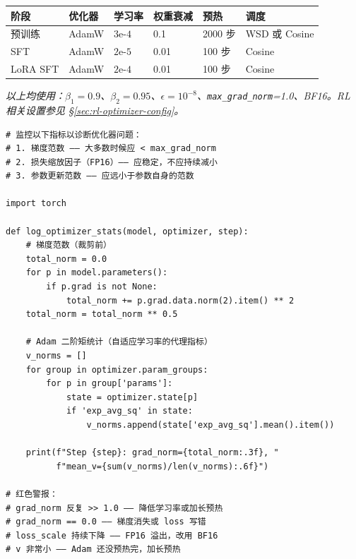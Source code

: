 \begin{keybox}[优化器超参数参考表]
\noindent\begin{tabularx}{\linewidth}{@{}l Z{0.92} Z{0.92} Z{0.92} Z{0.92} Z{1.32}@{}}
\toprule
\textbf{阶段} & \textbf{优化器} & \textbf{学习率} & \textbf{权重衰减} & \textbf{预热} & \textbf{调度} \\
\midrule
预训练 & AdamW & $3\text{e-}4$ & 0.1 & 2000 步 & WSD 或 Cosine \\
SFT & AdamW & $2\text{e-}5$ & 0.01 & 100 步 & Cosine \\
LoRA SFT & AdamW & $2\text{e-}4$ & 0.01 & 100 步 & Cosine \\
\bottomrule
\end{tabularx}

\emph{以上均使用：$\beta_1{=}0.9$、$\beta_2{=}0.95$、$\epsilon{=}10^{-8}$、\texttt{max\_grad\_norm}=1.0、BF16。RL 相关设置参见 §\ref{sec:rl-optimizer-config}。}
\end{keybox}

\begin{examplebox}[诊断训练不稳定]
\begin{lstlisting}[style=pythonstyle]
# 监控以下指标以诊断优化器问题：
# 1. 梯度范数 —— 大多数时候应 < max_grad_norm
# 2. 损失缩放因子（FP16）—— 应稳定，不应持续减小
# 3. 参数更新范数 —— 应远小于参数自身的范数

import torch

def log_optimizer_stats(model, optimizer, step):
    # 梯度范数（裁剪前）
    total_norm = 0.0
    for p in model.parameters():
        if p.grad is not None:
            total_norm += p.grad.data.norm(2).item() ** 2
    total_norm = total_norm ** 0.5

    # Adam 二阶矩统计（自适应学习率的代理指标）
    v_norms = []
    for group in optimizer.param_groups:
        for p in group['params']:
            state = optimizer.state[p]
            if 'exp_avg_sq' in state:
                v_norms.append(state['exp_avg_sq'].mean().item())

    print(f"Step {step}: grad_norm={total_norm:.3f}, "
          f"mean_v={sum(v_norms)/len(v_norms):.6f}")

# 红色警报：
# grad_norm 反复 >> 1.0 —— 降低学习率或加长预热
# grad_norm == 0.0 —— 梯度消失或 loss 写错
# loss_scale 持续下降 —— FP16 溢出，改用 BF16
# v 非常小 —— Adam 还没预热完，加长预热
\end{lstlisting}
\end{examplebox}

